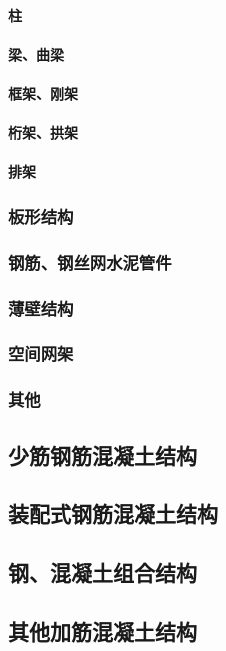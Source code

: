 \documentclass[UTF8]{../../ApplicationUniverse}
\begin{document}
            \paragraph{柱}
            \paragraph{梁、曲梁}
            \paragraph{框架、刚架}
            \paragraph{桁架、拱架}
            \paragraph{排架}
        \subsubsection{板形结构}
        \subsubsection{钢筋、钢丝网水泥管件}
        \subsubsection{薄壁结构}
        \subsubsection{空间网架}
        \subsubsection{其他}
    \subsection{少筋钢筋混凝土结构}
    \subsection{装配式钢筋混凝土结构}
    \subsection{钢、混凝土组合结构}
    \subsection{其他加筋混凝土结构}
\end{document}
